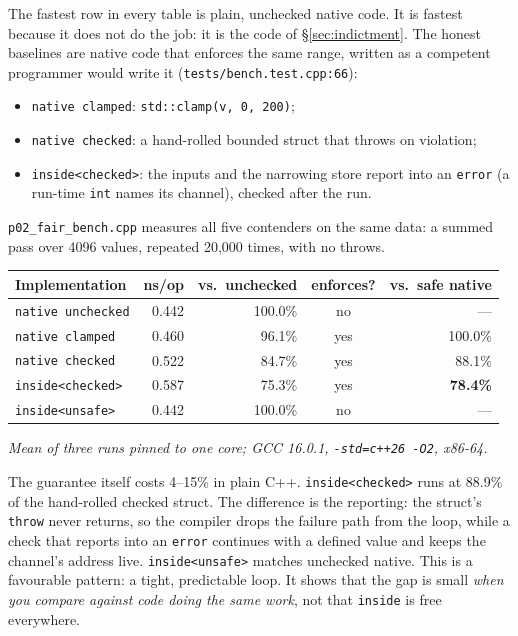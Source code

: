 \documentclass[11pt,a4paper]{article}
\newcommand{\code}[1]{\texttt{\small #1}}
\newcommand{\file}[1]{\texttt{\small #1}}
\begin{document}
The fastest row in every table is plain, unchecked native code. It is fastest
because it does not do the job: it is the code of \S\ref{sec:indictment}.
The honest baselines are native code that enforces the same range, written as
a competent programmer would write it
(\file{tests/bench.test.cpp:66}):
\begin{itemize}
\item \code{native clamped}: \code{std::clamp(v, 0, 200)};
\item \code{native checked}: a hand-rolled bounded struct that throws on
      violation;
\item \code{inside<checked>}: the inputs and the narrowing store report into
      an \code{error} (a run-time \code{int} names its channel), checked after
      the run.
\end{itemize}
\file{p02\_fair\_bench.cpp} measures all five contenders on the same data: a
summed pass over 4096 values, repeated 20{,}000 times, with no throws.

\begin{center}
\small
\begin{tabular}{@{}l r r c r@{}}
\toprule
Implementation & ns/op & vs.\ unchecked & enforces? & vs.\ safe native \\
\midrule
\code{native unchecked}   & 0.442 & 100.0\% & no  & --- \\
\code{native clamped}     & 0.460 &  96.1\% & yes & 100.0\% \\
\code{native checked}     & 0.522 &  84.7\% & yes &  88.1\% \\
\code{inside<checked>}    & 0.587 &  75.3\% & yes & \textbf{78.4\%} \\
\code{inside<unsafe>}     & 0.442 & 100.0\% & no  & --- \\
\bottomrule
\end{tabular}
\end{center}

\noindent
\emph{Mean of three runs pinned to one core; GCC 16.0.1, \code{-std=c++26 -O2}, x86-64.}

The guarantee itself costs 4--15\% in plain C++. \code{inside<checked>} runs at
88.9\% of the hand-rolled checked struct. The difference is the reporting: the
struct's \code{throw} never returns, so the compiler drops the failure path from
the loop, while a check that reports into an \code{error} continues with a
defined value and keeps the channel's address live.
\code{inside<unsafe>} matches unchecked native. This is a favourable pattern:
a tight, predictable loop. It shows that the gap is small \emph{when you
compare against code doing the same work}, not that \code{inside} is free
everywhere.
\end{document}
